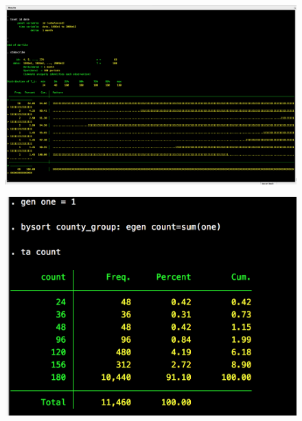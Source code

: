 \documentclass[notes=show]{beamer}
\begin{document}
\begin{frame}[plain]

\begin{figure}
\centering
\includegraphics[scale=0.1]{./lecture_includes/unbalanced_panel.png}
\end{figure}

\end{frame}


\begin{frame}[plain]

\begin{figure}
\centering
\includegraphics[scale=0.2]{./lecture_includes/unbalanced_panel_b.png}
\end{figure}

\end{frame}
\end{document}
